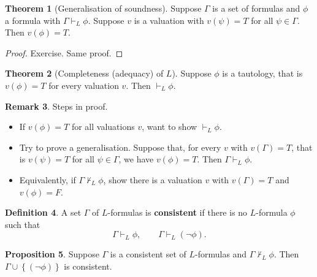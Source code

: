 \documentclass{article}
\newcommand{\rb}[1]{\left( #1 \right)}
\newcommand{\cb}[1]{\left\{ #1 \right\}}
\newcommand{\notb}[1]{\rb{\neg #1}}
\theoremstyle{definition}\newtheorem{definition}{Definition}[subsection]
\theoremstyle{definition}\newtheorem{remark1}[definition]{Remark}
\theoremstyle{definition}\newtheorem{example1}[definition]{Example}
\theoremstyle{definition}\newtheorem*{remark2}{Remark}
\theoremstyle{definition}\newtheorem*{example2}{Example}
\theoremstyle{definition}\newtheorem*{note}{Note}
\theoremstyle{definition}\newtheorem*{notation}{Notation}
\newtheorem{proposition}[definition]{Proposition}
\newtheorem{theorem}[definition]{Theorem}
\begin{document}
\begin{theorem}[Generalisation of soundness]
Suppose $ \Gamma $ is a set of formulas and $ \phi $ a formula with $ \Gamma \vdash_L \phi $. Suppose $ v $ is a valuation with $ v\rb{\psi} = T $ for all $ \psi \in \Gamma $. Then $ v\rb{\phi} = T $.
\end{theorem}

\begin{proof}
Exercise. Same proof.
\end{proof}

\pagebreak

\begin{theorem}[Completeness (adequacy) of $ L $]
\label{thm:1.3.4}
Suppose $ \phi $ is a tautology, that is $ v\rb{\phi} = T $ for every valuation $ v $. Then $ \vdash_L \phi $.
\end{theorem}

\begin{remark1}
Steps in proof.
\begin{itemize}
\item If $ v\rb{\phi} = T $ for all valuations $ v $, want to show $ \vdash_L \phi $.
\item Try to prove a generalisation. Suppose that, for every $ v $ with $ v\rb{\Gamma} = T $, that is $ v\rb{\psi} = T $ for all $ \psi \in \Gamma $, we have $ v\rb{\phi} = T $. Then $ \Gamma \vdash_L \phi $.
\item Equivalently, if $ \Gamma \not\vdash_L \phi $, show there is a valuation $ v $ with $ v\rb{\Gamma} = T $ and $ v\rb{\phi} = F $.
\end{itemize}
\end{remark1}

\begin{definition}
A set $ \Gamma $ of $ L $-formulas is \textbf{consistent} if there is no $ L $-formula $ \phi $ such that
$$ \Gamma \vdash_L \phi, \qquad \Gamma \vdash_L \notb{\phi}. $$
\end{definition}

\begin{proposition}
\label{prop:1.3.7}
Suppose $ \Gamma $ is a consistent set of $ L $-formulas and $ \Gamma \not\vdash_L \phi $. Then $ \Gamma \cup \cb{\notb{\phi}} $ is consistent.
\end{proposition}
\end{document}
